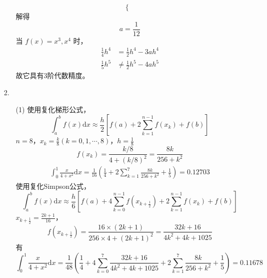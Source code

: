 \documentclass{sjtuarticle}
\def\dd{\mathrm{d}}
\begin{document}
\begin{itemize}
\begin{solution}
\begin{itemize}
\begin{equation*}
\begin{cases}
            \end{cases}
        \end{equation*}
        解得
        \begin{equation*}
            a = \frac{1}{12}
        \end{equation*}
        当 $f(x)=x^3,x^4$ 时，
        \begin{align*}
            \frac{1}{4}h^4 &= \frac{1}{2}h^4 -3ah^4 \\
            \frac{1}{5}h^5 &\neq \frac{1}{2}h^5 -4ah^5
        \end{align*}
        故它具有3阶代数精度。
    \end{itemize}
    \end{solution}
    \item[2.]\begin{solution}
        \begin{itemize}
            \item[(1)] 使用复化梯形公式，
            \begin{equation*}
                \int_{a}^b f(x)\dd x \approx \frac{h}{2}[f(a)+2\sum_{k=1}^{n-1}f(x_k)+f(b)]
            \end{equation*}
            $n=8$，$x_k=\frac{k}{8}(k=0,1,\cdots,8)$，$h=\frac{1}{8}$
            \begin{equation*}
                f(x_k)=\frac{k/8}{4+(k/8)^2}=\frac{8k}{256+k^2}
            \end{equation*}
            \begin{align*}
                \int_{0}^1 \frac{x}{4+x^2}\dd x = \frac{1}{16}\left(\frac{1}{4}+2\sum_{k=1}^{7}\frac{8k}{256+k^2}+\frac{1}{5}\right)=0.12703
            \end{align*}
            使用复化Simpson公式，
            \begin{equation*}
                \int_a^b f(x)\dd x \approx \frac{h}{6}[f(a)+4\sum_{k=0}^{n-1}f(x_{k+\frac{1}{2}})+2\sum_{k=1}^{n-1}f(x_k)+f(b)]
            \end{equation*}
            $x_{k+\frac{1}{2}}=\frac{2k+1}{16}$，
            \begin{equation*}
                f(x_{k+\frac{1}{2}})=\frac{16\times (2k+1)}{256\times 4+(2k+1)^2}=\frac{32k+16}{4k^2+4k+1025}
            \end{equation*}
            有
            \begin{equation*}
                \int_{0}^1 \frac{x}{4+x^2}\dd x = \frac{1}{48}\left(\frac{1}{4}+4\sum_{k=0}^7\frac{32k+16}{4k^2+4k+1025}+2\sum_{k=1}^7\frac{8k}{256+k^2}+\frac{1}{5}\right)=0.11678
            \end{equation*}
        \end{itemize}
    \end{solution}
\end{itemize}
\end{document}

